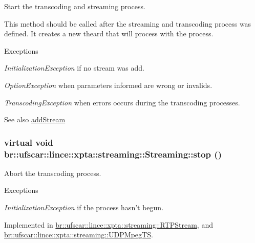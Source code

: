 Start the transcoding and streaming process. 

This method should be called after the streaming and transcoding process was defined. It creates a new theard that will process with the process. 
\begin{DoxyExceptions}{Exceptions}
\item[{\em InitializationException}]if no stream was add. \item[{\em OptionException}]when parameters informed are wrong or invalids. \item[{\em TranscodingException}]when errors occurs during the transcoding processes. \end{DoxyExceptions}
\begin{DoxySeeAlso}{See also}
\hyperlink{classbr_1_1ufscar_1_1lince_1_1xpta_1_1streaming_1_1Streaming_aec5910b2e3d8c442c16b08ee4717cad5}{addStream} 
\end{DoxySeeAlso}
\hypertarget{classbr_1_1ufscar_1_1lince_1_1xpta_1_1streaming_1_1Streaming_a2d1975eb985a2854d4d6f4c36c002910}{
\subsubsection[{stop}]{\setlength{\rightskip}{0pt plus 5cm}virtual void br::ufscar::lince::xpta::streaming::Streaming::stop ()}}
\label{classbr_1_1ufscar_1_1lince_1_1xpta_1_1streaming_1_1Streaming_a2d1975eb985a2854d4d6f4c36c002910}


Abort the transcoding process. 


\begin{DoxyExceptions}{Exceptions}
\item[{\em InitializationException}]if the process hasn't begun. \end{DoxyExceptions}


Implemented in \hyperlink{classbr_1_1ufscar_1_1lince_1_1xpta_1_1streaming_1_1RTPStream_ac5f8339bae0f9a0dbf5068fc78cd2df4}{br::ufscar::lince::xpta::streaming::RTPStream}, and \hyperlink{classbr_1_1ufscar_1_1lince_1_1xpta_1_1streaming_1_1UDPMpegTS_a93e9440df823daca067f260fcbac323f}{br::ufscar::lince::xpta::streaming::UDPMpegTS}.

